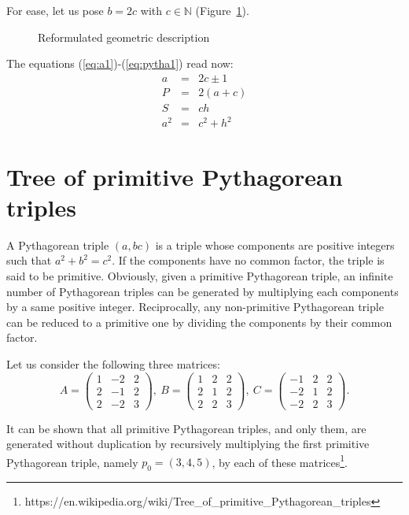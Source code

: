 \documentclass[11pt, twoside, a4paper]{article}
\newcommand{\Figure}[1]{Figure~\ref{#1}}
\newcommand{\set}[1]{\mathbb{#1}}
\begin{document}
For ease, let us pose $b=2c$ with $c\in\set N$ (\Figure{fig:triangle2}). 
\begin{figure}
    \begin{center}
        \caption{Reformulated geometric description}
        \label{fig:triangle2}
    \end{center}
\end{figure}

The equations (\ref{eq:a1})-(\ref{eq:pytha1}) read now:
\begin{eqnarray}
a & = & 2c \pm 1 \\
P & = & 2(a+c) \\ 
S & = & ch \\
a^2 & = & c^2 + h^2 
\end{eqnarray}

\section{Tree of primitive Pythagorean triples}
A Pythagorean triple $(a, b c)$ is a triple whose components are positive integers such that $a^2+b^2=c^2$. If the components have no common factor, the triple is said to be primitive. Obviously, given a primitive Pythagorean triple, an infinite number of Pythagorean triples can be generated by multiplying each components by a same positive integer. Reciprocally, any non-primitive Pythagorean triple can be reduced to a primitive one by dividing the components by their common factor.

Let us consider the following three matrices:
\[
A = \left(\begin{matrix}  1 & -2 & 2 \\  2 & -1 & 2 \\  2 & -2 & 3 \end{matrix} \right)\!,\ 
B = \left(\begin{matrix}  1 &  2 & 2 \\  2 &  1 & 2 \\  2 &  2 & 3 \end{matrix} \right)\!,\
C = \left(\begin{matrix} -1 &  2 & 2 \\ -2 &  1 & 2 \\ -2 &  2 & 3 \end{matrix} \right)\!.
\]

It can be shown that all primitive Pythagorean triples, and only them, are generated without duplication by recursively multiplying the first primitive Pythagorean triple, namely $p_0=(3, 4, 5)$, by each of these matrices\footnote{https://en.wikipedia.org/wiki/Tree\_of\_primitive\_Pythagorean\_triples}.
\end{document}
